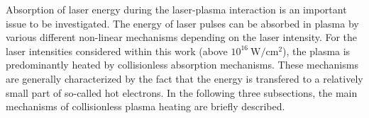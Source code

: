 Absorption of laser energy during the laser-plasma interaction is an important issue to be investigated. The energy of laser pulses can be absorbed in plasma by various different non-linear mechanisms depending on the laser intensity. For the laser intensities considered within this work (above $ 10^{16} \ \mathrm{W/cm^2} $), the plasma is predominantly heated by collisionless absorption mechanisms. These mechanisms are generally characterized by the fact that the energy is transfered to a relatively small part of so-called hot electrons. In the following three subsections, the main mechanisms of collisionless plasma heating are briefly described.
